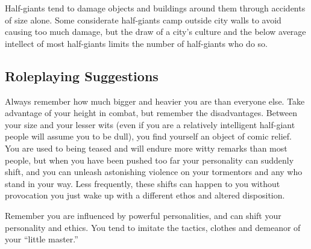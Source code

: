 Half-giants tend to damage objects and buildings around them through accidents of size alone. Some considerate half-giants camp outside city walls to avoid causing too much damage, but the draw of a city's culture and the below average intellect of most half-giants limits the number of half-giants who do so.

\subsection{Roleplaying Suggestions}
Always remember how much bigger and heavier you are than everyone else. Take advantage of your height in combat, but remember the disadvantages. Between your size and your lesser wits (even if you are a relatively intelligent half-giant people will assume you to be dull), you find yourself an object of comic relief. You are used to being teased and will endure more witty remarks than most people, but when you have been pushed too far your personality can suddenly shift, and you can unleash astonishing violence on your tormentors and any who stand in your way. Less frequently, these shifts can happen to you without provocation you just wake up with a different ethos and altered disposition.

Remember you are influenced by powerful personalities, and can shift your personality and ethics. You tend to imitate the tactics, clothes and demeanor of your ``little master.''
